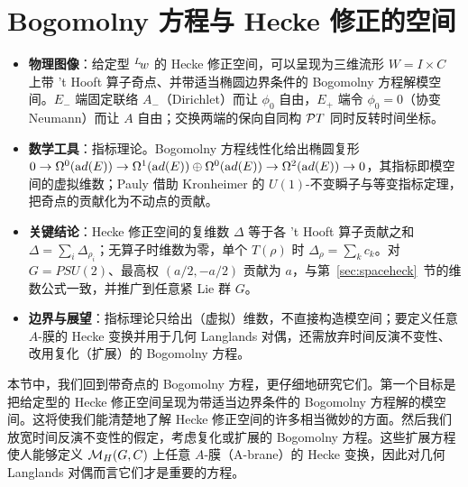 
\section{Bogomolny 方程与 Hecke 修正的空间}

\label{sec:bogeqheck}

\begin{keytakeaways}
  \begin{itemize}[leftmargin=1.4em,itemsep=2pt,topsep=2pt]
    \item \textbf{物理图像}：给定型 $^L\negthinspace w$ 的 Hecke 修正空间，可以呈现为三维流形 $W=I\times C$ 上带 't Hooft 算子奇点、并带适当椭圆边界条件的 Bogomolny 方程解模空间。$E_-$ 端固定联络 $A_-$（Dirichlet）而让 $\phi_0$ 自由，$E_+$ 端令 $\phi_0=0$（协变 Neumann）而让 $A$ 自由；交换两端的保向自同构 ${\cal PT}$ 同时反转时间坐标。
    \item \textbf{数学工具}：指标理论。Bogomolny 方程线性化给出椭圆复形 $0\to\Omega^0({\rm ad}(E))\to\Omega^1({\rm ad}(E))\oplus\Omega^0({\rm ad}(E))\to\Omega^2({\rm ad}(E))\to 0$，其指标即模空间的虚拟维数；Pauly 借助 Kronheimer 的 $U(1)$-不变瞬子与等变指标定理，把奇点的贡献化为不动点的贡献。
    \item \textbf{关键结论}：Hecke 修正空间的复维数 $\Delta$ 等于各 't Hooft 算子贡献之和 $\Delta=\sum_i\Delta_{\rho_i}$；无算子时维数为零，单个 $T(\rho)$ 时 $\Delta_\rho=\sum_k c_k$。对 $G=PSU(2)$、最高权 $(a/2,-a/2)$ 贡献为 $a$，与第~\ref{sec:spaceheck}~节的维数公式一致，并推广到任意紧 Lie 群 $G$。
    \item \textbf{边界与展望}：指标理论只给出（虚拟）维数，不直接构造模空间；要定义任意 $A$-膜的 Hecke 变换并用于几何 Langlands 对偶，还需放弃时间反演不变性、改用复化（扩展）的 Bogomolny 方程。
  \end{itemize}
\end{keytakeaways}

本节中，我们回到带奇点的 Bogomolny 方程，更仔细地研究它们。第一个目标是把给定型的 Hecke 修正空间呈现为带适当边界条件的 Bogomolny 方程解的模空间。这将使我们能清楚地了解 Hecke 修正空间的许多相当微妙的方面。然后我们放宽时间反演不变性的假定，考虑复化或扩展的 Bogomolny 方程。这些扩展方程使人能够定义 $\MH(G,C)$ 上任意 $A$-膜（A-brane）的 Hecke 变换，因此对几何 Langlands 对偶而言它们才是重要的方程。

